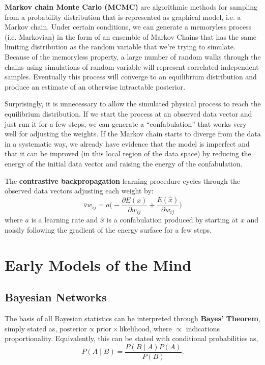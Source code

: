 \documentclass{article}
\begin{document}
\textbf{Markov chain Monte Carlo (MCMC)} are algorithmic methods for sampling from a probability distribution that is represented as graphical model, i.e. a Markov chain. Under certain conditions, we can generate a memoryless process (i.e. Markovian) in the form of an ensemble of Markov Chains that has the same limiting distribution as the random variable that we're trying to simulate. Because of the memoryless property, a large number of random walks through the chains using simulations of random variable will represent correlated independent samples. Eventually this process will converge to an equilibrium distribution and produce an estimate of an otherwise intractable posterior.

Surprisingly, it is unnecessary to allow the simulated physical process to reach the equilibrium distribution. If we start the process at an observed data vector and just run it for a few steps, we can generate a ``confabulation” that works very well for adjusting the weights. If the Markov chain starts to diverge from the data in a systematic way, we already have evidence that the model is imperfect and that it can be improved (in this local region of the data space) by reducing the energy of the initial data vector and raising the energy of the confabulation. 

The \textbf{contrastive backpropagation} learning procedure cycles through the observed data vectors adjusting each weight by:
\[
    \triangledown w_{ij} = a \bigg (  - \frac{\partial E(x)}{\partial w_{ij}} +  \frac{E(\hat x)}{\partial w_{ij}} \bigg)
\]
where $a$ is a learning rate and $\hat x$ is a confabulation produced by starting at $x$ and noisily following the gradient of the energy surface for a few steps.


\section{Early Models of the Mind}

\subsection{Bayesian Networks}

The basis of all Bayesian statistics can be interpreted through \textbf{Bayes' Theorem}, simply stated as, $\text{posterior}\propto \text{prior} \times \text{likelihood}$, where $\propto$ indications proportionality. Equivalently, this can be stated with conditional probabilities as,
\[
P(A\mid B)={\frac {P(B\mid A)P(A)}{P(B)}}.
\]
\end{document}

